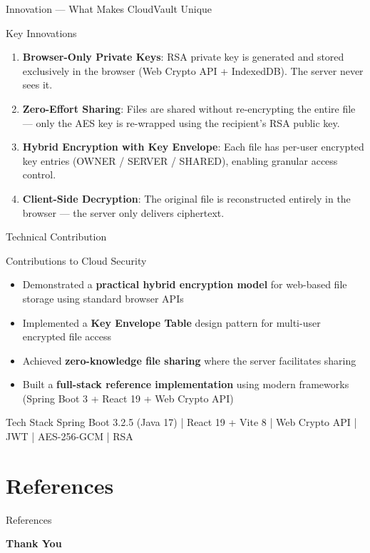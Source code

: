 \documentclass{SKP-beamer}
\begin{document}
\begin{frame}{Innovation --- What Makes CloudVault Unique}
\begin{block}{Key Innovations}
\begin{enumerate}
  \item \textbf{Browser-Only Private Keys}: RSA private key is generated and stored exclusively in the browser (Web Crypto API + IndexedDB). The server \alert{never} sees it.
  \item \textbf{Zero-Effort Sharing}: Files are shared without re-encrypting the entire file --- only the AES key is re-wrapped using the recipient's RSA public key.
  \item \textbf{Hybrid Encryption with Key Envelope}: Each file has per-user encrypted key entries (OWNER / SERVER / SHARED), enabling granular access control.
  \item \textbf{Client-Side Decryption}: The original file is reconstructed entirely in the browser --- the server only delivers ciphertext.
\end{enumerate}
\end{block}
\end{frame}

\begin{frame}{Technical Contribution}
\begin{block}{Contributions to Cloud Security}
\begin{itemize}
  \item Demonstrated a \textbf{practical hybrid encryption model} for web-based file storage using standard browser APIs
  \item Implemented a \textbf{Key Envelope Table} design pattern for multi-user encrypted file access
  \item Achieved \textbf{zero-knowledge file sharing} where the server facilitates sharing
  \item Built a \textbf{full-stack reference implementation} using modern frameworks (Spring Boot 3 + React 19 + Web Crypto API)
\end{itemize}
\end{block}

\vspace{0.2cm}
\begin{exampleblock}{Tech Stack}
Spring Boot 3.2.5 (Java 17) | React 19 + Vite 8 | Web Crypto API | JWT | AES-256-GCM | RSA
\end{exampleblock}
\end{frame}

\section{References}
\begin{frame}{References}
    \nocite{*}
	
	
\end{frame}

\begin{frame}{}
\begin{center}
\vspace{2cm}
{\Huge \textbf{Thank You}}
\end{center}
\end{frame}
\end{document}
